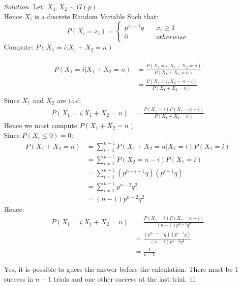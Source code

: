 \documentclass[10pt]{article}
\theoremstyle{definition}
\begin{document}
\begin{proof}[Solution]
Let: $X_{1}, X_{2} \sim G(p)$\\
Hence $X_i$ is a discrete Random Variable Such that: 
\begin{equation*}
    P(X_i = x_i) = \begin{cases}
    p^{x_{i}-1}q \quad & x_i \geq 1\\
    0 & otherwise
    \end{cases}
\end{equation*}
Compute: $P(X_{1} = i | X_{1} + X_{2} = n)$ \\\\
\begin{align*}
P(X_{1} = i | X_{1} + X_{2} = n) &= 
                \frac{P(X_1 = i, X_1 + X_2 = n)}
                        {P(X_1 + X_2 = n)}\\
            &=
                \frac{P(X_1 = i, X_2 = n - i)}
                        {P(X_1 + X_2 = n)}\\
\end{align*}
Since $X_1$ and $X_2$ are i.i.d:
\begin{align*}
P(X_{1} = i | X_{1} + X_{2} = n) &= 
                \frac{P(X_1 = i)P(X_2 = n - i)}
                        {P(X_1 + X_2 = n)}
\end{align*}
Hence we must compute $P(X_1 + X_2 = n)$\\
Since $P(X_i \leq 0) = 0$:
\begin{align*}
P(X_1 + X_2 = n) &= \sum^{n-1}_{i=1}P(X_1+X_2=n|X_1=i)P(X_1=i)\\
                &= \sum^{n-1}_{i=1}P(X_2=n-i)P(X_1=i)\\
                &= \sum^{n-1}_{i=1}(p^{n-i-1}q)(p^{i-1}q)\\
                &= \sum^{n-1}_{i=1}p^{n-2}q^2\\
                &= (n-1)p^{n-2}q^2
\end{align*}
Hence:
\begin{align*}
 P(X_{1} = i | X_{1} + X_{2} = n) 
        &= \frac{P(X_1 = i)P(X_2 = n - i)} {(n-1)p^{n-2}q^2}\\
        &= \frac{(p^{n - i - 1}q)(p^{i - 1}q)} {(n-1)p^{n-2}q^2}\\
        &= \frac{1}{n-1}
\end{align*}

Yes, it is possible to guess the answer before the calculation.
There must be 1 success in $n-1$ trials and one other success at the last trial.


\end{proof}
\end{document}
